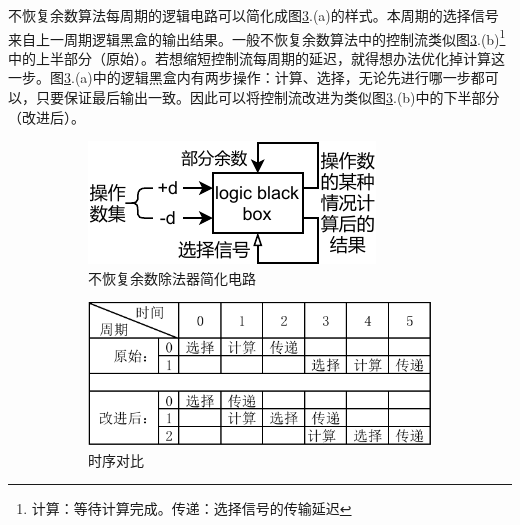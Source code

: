 \documentclass[UTF8,12pt,punct=kaiming,fontset=none]{ctexart}
\begin{document}
不恢复余数算法每周期的逻辑电路可以简化成图\ref{fig5}.(a)的样式。本周期的选择信号来自上一周期逻辑黑盒的输出结果。一般不恢复余数算法中的控制流类似图\ref{fig5}.(b)\footnote{计算：等待计算完成。传递：选择信号的传输延迟}中的上半部分（原始）。若想缩短控制流每周期的延迟，就得想办法优化掉计算这一步。图\ref{fig5}.(a)中的逻辑黑盒内有两步操作：计算、选择，无论先进行哪一步都可以，只要保证最后输出一致。因此可以将控制流改进为类似图\ref{fig5}.(b)中的下半部分（改进后）。

\begin{figure}[H]
    \centering
    \begin{subfigure}{6cm}
        \includegraphics[width=\linewidth]{divb.pdf}
        \caption{不恢复余数除法器简化电路}
        \label{fig5:a} %
    \end{subfigure}
    \hspace{0.5in}%
    \begin{subfigure}{8cm}
        \includegraphics[width=\linewidth]{divt.pdf}
        \caption{时序对比}
        \label{fig5:subfig:b} %
    \end{subfigure}
    \caption{}
    \label{fig5} %
\end{figure}
\end{document}
